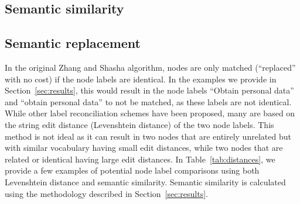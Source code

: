



\subsection{Semantic similarity}








\subsection{Semantic replacement}

In the original Zhang and Shasha algorithm, nodes are only matched (``replaced'' with no cost) if the node labels are identical. In the examples we provide in Section~\ref{sec:results}, this would result in the node labels ``Obtain personal data'' and ``obtain personal data'' to not be matched, as these labels are not identical. While other label reconciliation schemes have been proposed, many are based on the string edit distance (Levenshtein distance) of the two node labels. This method is not ideal as it can result in two nodes that are entirely unrelated but with similar vocabulary having small edit distances, while two nodes that are related or identical having large edit distances. In Table~\ref{tab:distances}, we provide a few examples of potential node label comparisons using both Levenshtein distance and semantic similarity. Semantic similarity is calculated using the methodology described in Section~\ref{sec:results}.

